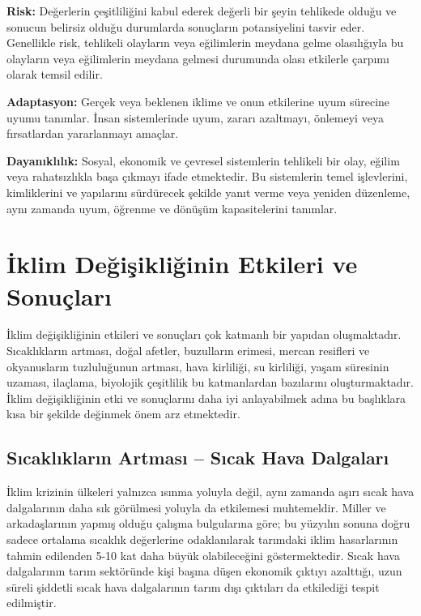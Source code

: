 \documentclass[
]{book}
\begin{document}
\textbf{Risk:} Değerlerin çeşitliliğini kabul ederek değerli bir şeyin tehlikede olduğu ve sonucun belirsiz olduğu durumlarda sonuçların potansiyelini tasvir eder. Genellikle risk, tehlikeli olayların veya eğilimlerin meydana gelme olasılığıyla bu olayların veya eğilimlerin meydana gelmesi durumunda olası etkilerle çarpımı olarak temsil edilir.

\textbf{Adaptasyon:} Gerçek veya beklenen iklime ve onun etkilerine uyum sürecine uyumu tanımlar. İnsan sistemlerinde uyum, zararı azaltmayı, önlemeyi veya fırsatlardan yararlanmayı amaçlar.

\textbf{Dayanıklılık:} Sosyal, ekonomik ve çevresel sistemlerin tehlikeli bir olay, eğilim veya rahatsızlıkla başa çıkmayı ifade etmektedir. Bu sistemlerin temel işlevlerini, kimliklerini ve yapılarını sürdürecek şekilde yanıt verme veya yeniden düzenleme, aynı zamanda uyum, öğrenme ve dönüşüm kapasitelerini tanımlar.

\hypertarget{iklim-deux11fiux15fikliux11finin-etkileri-ve-sonuuxe7larux131}{%
\section{İklim Değişikliğinin Etkileri ve Sonuçları}\label{iklim-deux11fiux15fikliux11finin-etkileri-ve-sonuuxe7larux131}}

İklim değişikliğinin etkileri ve sonuçları çok katmanlı bir yapıdan oluşmaktadır. Sıcaklıkların artması, doğal afetler, buzulların erimesi, mercan resifleri ve okyanusların tuzluluğunun artması, hava kirliliği, su kirliliği, yaşam süresinin uzaması, ilaçlama, biyolojik çeşitlilik bu katmanlardan bazılarını oluşturmaktadır. İklim değişikliğinin etki ve sonuçlarını daha iyi anlayabilmek adına bu başlıklara kısa bir şekilde değinmek önem arz etmektedir.

\hypertarget{sux131caklux131klarux131n-artmasux131-sux131cak-hava-dalgalarux131}{%
\subsection{Sıcaklıkların Artması -- Sıcak Hava Dalgaları}\label{sux131caklux131klarux131n-artmasux131-sux131cak-hava-dalgalarux131}}

İklim krizinin ülkeleri yalnızca ısınma yoluyla değil, aynı zamanda aşırı sıcak hava dalgalarının daha sık görülmesi yoluyla da etkilemesi muhtemeldir. Miller ve arkadaşlarının yapmış olduğu çalışma bulgularına göre; bu yüzyılın sonuna doğru sadece ortalama sıcaklık değerlerine odaklanılarak tarımdaki iklim hasarlarının tahmin edilenden 5-10 kat daha büyük olabileceğini göstermektedir. Sıcak hava dalgalarının tarım sektöründe kişi başına düşen ekonomik çıktıyı azalttığı, uzun süreli şiddetli sıcak hava dalgalarının tarım dışı çıktıları da etkilediği tespit edilmiştir. \citep{miller2021heat}
\end{document}
